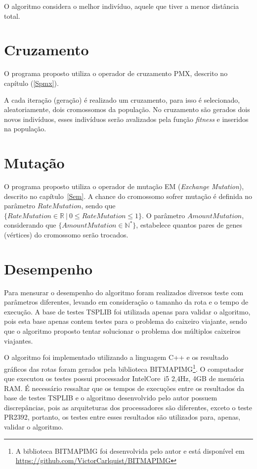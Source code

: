 \documentclass[12pt,openright,a4paper,twoside]{tcc}
\begin{document}
		O algoritmo considera o melhor indivíduo, aquele que tiver a menor distância total. 

		\section{Cruzamento}

			O programa proposto utiliza o operador de cruzamento PMX, descrito no capítulo (\ref{Spmx}). 
			
			A cada iteração (geração) é realizado um cruzamento, para isso é selecionado, aleatoriamente, dois cromossomos da população. No cruzamento são gerados dois novos indivíduos, esses indivíduos serão avalizados pela função \textit{fitness} e inseridos na população.

		\section{Mutação}

			O programa proposto utiliza o operador de mutação EM (\textit{Exchange Mutation}), descrito no capítulo~\ref{Sem}. A chance do cromossomo sofrer mutação é definida no parâmetro $RateMutation$, sendo que $\{RateMutation \in \mathbb{R}~|~ 0 \leq RateMutation \leq 1\}$. O parâmetro  $AmountMutation$, considerando que  $\{AmountMutation \in \mathbb{N}^*\}$, estabelece quantos pares de genes (vértices) do cromossomo serão trocados.
						
		
			
		\section{Desempenho}
		
		Para mensurar o desempenho do algoritmo foram realizados diversos teste com parâmetros diferentes, levando em consideração o tamanho da rota e o tempo de execução. A base de testes TSPLIB foi utilizada apenas para validar o algoritmo, pois esta base apenas contem testes para o problema do caixeiro viajante, sendo que o algoritmo proposto tentar solucionar o problema dos múltiplos caixeiros viajantes. 
		
		O algoritmo foi implementado utilizando a linguagem C++ e os resultado gráficos das rotas foram gerados pela biblioteca BITMAPIMG\footnote{A biblioteca BITMAPIMG foi desenvolvida pelo autor e está disponível em \url{https://github.com/VictorCarlquist/BITMAPIMG}}.
		O computador que executou os testes possui processador Intel\textregistered Core\texttrademark ~i5 2,4Hz, 4GB de memória RAM. É necessário ressaltar que os tempos de execuções entre os resultados da base de testes TSPLIB e o algoritmo desenvolvido pelo autor possuem discrepâncias, pois as arquiteturas dos processadores são diferentes, exceto o teste PR2392, portanto, os testes entre esses resultados são utilizados para, apenas, validar o algoritmo.
\end{document}
